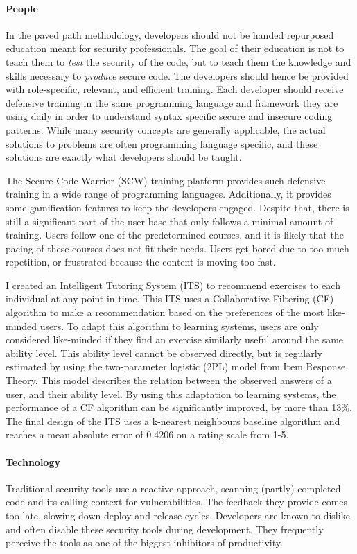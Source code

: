 \paragraph{People}
In the paved path methodology, developers should not be handed repurposed education meant for security professionals.
The goal of their education is not to teach them to \textit{test} the security of the code, but to teach them the knowledge and skills necessary to \textit{produce} secure code.
The developers should hence be provided with role-specific, relevant, and efficient training.
Each developer should receive defensive training in the same programming language and framework they are using daily in order to understand syntax specific secure and insecure coding patterns.
While many security concepts are generally applicable, the actual solutions to problems are often programming language specific, and these solutions are exactly what developers should be taught.

The Secure Code Warrior (SCW) training platform provides such defensive training in a wide range of programming languages.
Additionally, it provides some gamification features to keep the developers engaged.
Despite that, there is still a significant part of the user base that only follows a minimal amount of training.
Users follow one of the predetermined courses, and it is likely that the pacing of these courses does not fit their needs.
Users get bored due to too much repetition, or frustrated because the content is moving too fast.

I created an Intelligent Tutoring System (ITS) to recommend exercises to each individual at any point in time.
This ITS uses a Collaborative Filtering (CF) algorithm to make a recommendation based on the preferences of the most like-minded users.
To adapt this algorithm to learning systems, users are only considered like-minded if they find an exercise similarly useful around the same ability level.
This ability level cannot be observed directly, but is regularly estimated by using the two-parameter logistic (2PL) model from Item Response Theory.
This model describes the relation between the observed answers of a user, and their ability level.
By using this adaptation to learning systems, the performance of a CF algorithm can be significantly improved, by more than 13\%.
The final design of the ITS uses a k-nearest neighbours baseline algorithm and reaches a mean absolute error of 0.4206 on a rating scale from 1-5.

\paragraph{Technology}
Traditional security tools use a reactive approach, scanning (partly) completed code and its calling context for vulnerabilities.
The feedback they provide comes too late, slowing down deploy and release cycles.
Developers are known to dislike and often disable these security tools during development.
They frequently perceive the tools as one of the biggest inhibitors of productivity.

